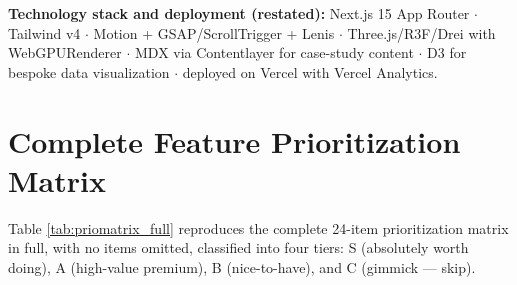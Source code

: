\documentclass[conference]{IEEEtran}
\begin{document}
\textbf{Technology stack and deployment (restated):} Next.js 15 App Router $\cdot$ Tailwind v4 $\cdot$ Motion + GSAP/ScrollTrigger + Lenis $\cdot$ Three.js/R3F/Drei with WebGPURenderer $\cdot$ MDX via Contentlayer for case-study content $\cdot$ D3 for bespoke data visualization $\cdot$ deployed on Vercel with Vercel Analytics.

\section{Complete Feature Prioritization Matrix}

Table \ref{tab:priomatrix_full} reproduces the complete 24-item prioritization matrix in full, with no items omitted, classified into four tiers: S (absolutely worth doing), A (high-value premium), B (nice-to-have), and C (gimmick --- skip).
\end{document}
